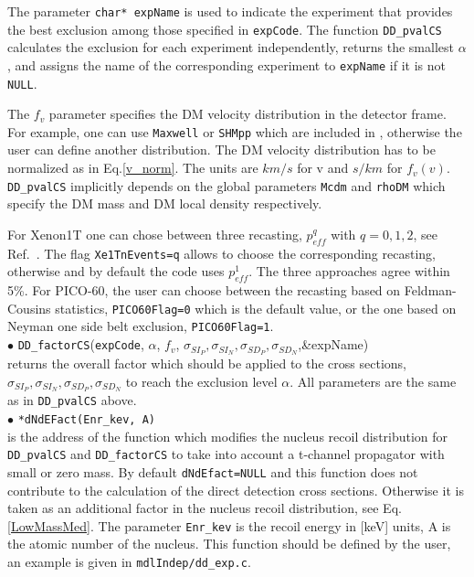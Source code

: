 \documentclass[12pt,a4paper]{article}
\begin{document}
The parameter {\tt char* expName}  is used to indicate the   experiment that  provides
the best exclusion among those specified in  {\tt expCode}.   The function {\tt DD\_pvalCS } calculates the
exclusion for each experiment  independently, returns the smallest $\alpha$, and assigns the 
name of the corresponding experiment to  {\tt expName}  if it is not {\tt NULL}.  

The $f_v$ parameter specifies the DM velocity distribution in the detector frame. For
example, one can use   {\tt Maxwell} or {\tt SHMpp} which are
included in \micro, 
otherwise the user can define another distribution.   
The DM velocity distribution  has to be normalized  as in Eq.\ref{v_norm}.
 The units  are $km/s$ for v and $s/km$ for  $f_v(v)$. {\tt DD\_pvalCS} implicitly depends on the 
global parameters  {\tt Mcdm}  and  {\tt rhoDM} which specify the DM mass and DM  local density respectively.


For  Xenon1T one can chose  between  three recasting, $p_{eff}^{q}$ with $q=0,1,2$, 
see Ref.~\cite{Belanger:2020gnr}. The  flag {\tt Xe1TnEvents=q} allows to choose the  corresponding recasting,  otherwise and by default the code uses  $p_{eff}^1$. The three approaches agree  within 5\%. For PICO-60, the user can choose between the recasting based on Feldman-Cousins statistics, {\tt PICO60Flag=0} 
which is the default value, or the one based on  Neyman one side belt exclusion, {\tt PICO60Flag=1}.\\ 



\noindent
$\bullet$ \verb|DD_factorCS|(\verb|expCode|, $\alpha$, $f_v$, $\sigma_{SI_P},\sigma_{SI_N},\sigma_{SD_P},\sigma_{SD_N}$,\&expName)\\ 
returns the overall factor which should be applied to the cross sections, $\sigma_{SI_P},\sigma_{SI_N},\sigma_{SD_P}, \sigma_{SD_N}$ to reach  the exclusion level $\alpha$.  
All parameters are the same as in {\tt DD\_pvalCS} above. \\

\noindent
$\bullet$ \verb|*dNdEFact(Enr_kev, A)|\\
is the address of the function which modifies the nucleus recoil distribution  for {\tt DD\_pvalCS}
and {\tt DD\_factorCS}   to take into account a 
t-channel propagator  with  small or zero mass.  By default \verb|dNdEfact=NULL| and this 
function does not contribute to  the calculation of the direct detection cross sections. Otherwise  it is taken as an additional factor 
in the nucleus recoil distribution, see Eq.\ref{LowMassMed}.  
The parameter {\tt Enr\_kev} is the recoil energy in [keV] units, A is the  atomic number of the nucleus. This function should be defined by the user, an example is given in 
\verb|mdlIndep/dd_exp.c|.\\
\end{document}
